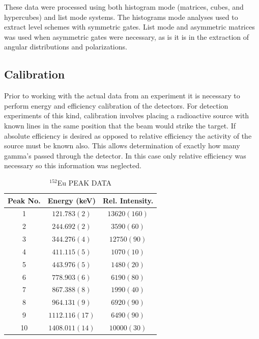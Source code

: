 These data were processed using both histogram mode (matrices, cubes, and hypercubes)\cite{radware} and list mode\cite{blue,ROOT} systems. The histograms mode analyses used to extract level schemes with symmetric gates. List mode and asymmetric matrices was used when asymmetric gates were necessary, as is it is in the extraction of angular distributions and polarizations.
 
\subsection{Calibration}
\label{ssec:exp-pr-data-proc-cal}
Prior to working with the actual data from an experiment it is necessary to perform energy and efficiency calibration of the detectors. For \gr{} detection experiments of this kind, calibration involves placing a radioactive source with known lines in the same position that the beam would strike the target. If absolute efficiency is desired as opposed to relative efficiency the activity of the source must be known also. This allows determination of exactly how many gamma's passed through the detector. In this case only relative efficiency was necessary so this information was neglected.

\begin{table}[hT!]
\caption{$^{152}$Eu PEAK DATA \label{tbl:152Eu-peaks}}
\begin{center}
\begin{tabular}{ccc}
\toprule
Peak No. & Energy (keV) & Rel. Intensity. \\ 
\midrule
1 & $121.783(2)$ & $13620(160)$ \\ 
2 & $244.692(2)$ & $3590(60)$ \\ 
3 & $344.276(4)$ & $12750(90)$ \\ 
4 & $411.115(5)$ & $1070(10)$ \\ 
5 & $443.976(5)$ & $1480(20)$ \\ 
6 & $778.903(6)$ & $6190(80)$ \\ 
7 & $867.388(8)$ & $1990(40)$ \\ 
8 & $964.131(9)$ & $6920(90)$ \\ 
9 & $1112.116(17)$ & $6490(90)$ \\ 
10 & $1408.011(14)$ & $10000(30)$ \\ 
\bottomrule
\end{tabular} 
\end{center}
\end{table}

